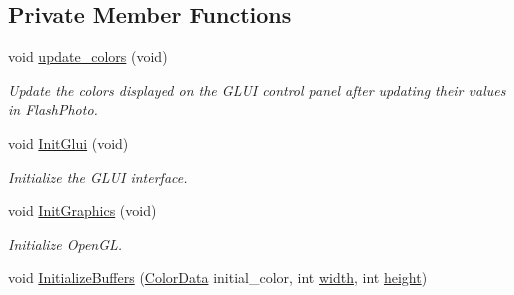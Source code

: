 \subsection*{Private Member Functions}
\begin{DoxyCompactItemize}
\item 
void \hyperlink{classimage__tools_1_1FlashPhotoApp_a4d51fdabaff836fc55a4f72a465773e7}{update\+\_\+colors} (void)\hypertarget{classimage__tools_1_1FlashPhotoApp_a4d51fdabaff836fc55a4f72a465773e7}{}\label{classimage__tools_1_1FlashPhotoApp_a4d51fdabaff836fc55a4f72a465773e7}

\begin{DoxyCompactList}\small\item\em Update the colors displayed on the G\+L\+UI control panel after updating their values in Flash\+Photo. \end{DoxyCompactList}\item 
void \hyperlink{classimage__tools_1_1FlashPhotoApp_a7e66fc64a72ba17648cb99491c773c9b}{Init\+Glui} (void)\hypertarget{classimage__tools_1_1FlashPhotoApp_a7e66fc64a72ba17648cb99491c773c9b}{}\label{classimage__tools_1_1FlashPhotoApp_a7e66fc64a72ba17648cb99491c773c9b}

\begin{DoxyCompactList}\small\item\em Initialize the G\+L\+UI interface. \end{DoxyCompactList}\item 
void \hyperlink{classimage__tools_1_1FlashPhotoApp_ac529b21d6c3466ed1b40cc159b172d0d}{Init\+Graphics} (void)\hypertarget{classimage__tools_1_1FlashPhotoApp_ac529b21d6c3466ed1b40cc159b172d0d}{}\label{classimage__tools_1_1FlashPhotoApp_ac529b21d6c3466ed1b40cc159b172d0d}

\begin{DoxyCompactList}\small\item\em Initialize Open\+GL. \end{DoxyCompactList}\item 
void \hyperlink{classimage__tools_1_1FlashPhotoApp_a08e318814d7f7fb1aa2c05a61711f672}{Initialize\+Buffers} (\hyperlink{classimage__tools_1_1ColorData}{Color\+Data} initial\+\_\+color, int \hyperlink{classimage__tools_1_1BaseGfxApp_a2fe403c5392f624477c2ce4429f1a7b5}{width}, int \hyperlink{classimage__tools_1_1BaseGfxApp_aa961e13a7a8e6062204223cc33ac7503}{height})\hypertarget{classimage__tools_1_1FlashPhotoApp_a08e318814d7f7fb1aa2c05a61711f672}{}\label{classimage__tools_1_1FlashPhotoApp_a08e318814d7f7fb1aa2c05a61711f672}


\end{DoxyCompactItemize}
